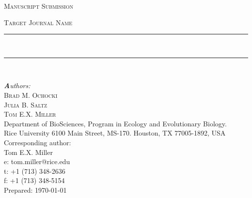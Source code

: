 \begin{titlepage}
\newcommand{\HRule}{\rule{\linewidth}{0.5mm}}
\center

\textsc{\large Manuscript Submission}

\vspace{0.2 in}
\textsc{\Large Target Journal Name}

\vspace{0.5 in}
\HRule\\
{\huge \textbf \papertitle \par}
\HRule\\
\vspace{0.5 in}
 
{\em\Large\textbf Authors:}\\
\vspace{.5 cm}
\textsc{Brad M. Ochocki}\\
\textsc{Julia B. Saltz}\\
\textsc{Tom E.X. Miller}\\
\vspace{0.5 cm}
Department of BioSciences, Program in Ecology and Evolutionary Biology.\\
Rice University 6100 Main Street, MS-170. Houston, TX 77005-1892, USA\\
\vspace{1.0 cm}
Corresponding author:\\
Tom E.X. Miller\\
e: tom.miller@rice.edu\\
t: +1 (713) 348-2636\\
f: +1 (713) 348-5154\\

\vspace{1.5 cm}
{\large Prepared: \today}\\[3cm]
\vfill
\end{titlepage}

\newpage